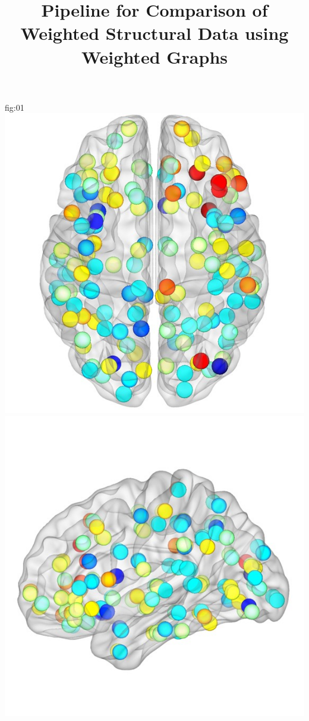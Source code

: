 \documentclass[justified]{tufte-handout}
\title{Pipeline for Comparison of Weighted Structural Data using Weighted Graphs}
\begin{document}
\maketitle

	{fig:01}
	{
	\includegraphics{fig_01_01.jpg}
	\includegraphics{fig_01_02.jpg}
}
\end{document}
